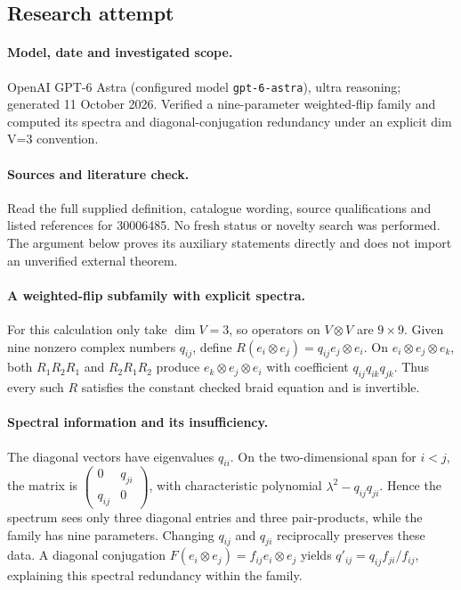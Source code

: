 \documentclass[11pt]{article}
\begin{document}
\subsection{Research attempt}
\paragraph{Model, date and investigated scope.}
OpenAI GPT-6 Astra (configured model \texttt{gpt-6-astra}), ultra reasoning; generated 11 October 2026. Verified a nine-parameter weighted-flip family and computed its spectra and diagonal-conjugation redundancy under an explicit dim V=3 convention.

\paragraph{Sources and literature check.}
Read the full supplied definition, catalogue wording, source qualifications and listed references for 30006485. No fresh status or novelty search was performed. The argument below proves its auxiliary statements directly and does not import an unverified external theorem.

\paragraph{A weighted-flip subfamily with explicit spectra.} For this calculation only take \(\dim V=3\), so operators on \(V\otimes V\) are \(9\times9\). Given nine nonzero complex numbers \(q_{ij}\), define \(R(e_i\otimes e_j)=q_{ij}e_j\otimes e_i\). On \(e_i\otimes e_j\otimes e_k\), both \(R_1R_2R_1\) and \(R_2R_1R_2\) produce \(e_k\otimes e_j\otimes e_i\) with coefficient \(q_{ij}q_{ik}q_{jk}\). Thus every such \(R\) satisfies the constant checked braid equation and is invertible.
\paragraph{Spectral information and its insufficiency.} The diagonal vectors have eigenvalues \(q_{ii}\). On the two-dimensional span for \(i<j\), the matrix is \(\left(\begin{smallmatrix}0&q_{ji}\\q_{ij}&0\end{smallmatrix}\right)\), with characteristic polynomial \(\lambda^2-q_{ij}q_{ji}\). Hence the spectrum sees only three diagonal entries and three pair-products, while the family has nine parameters. Changing \(q_{ij}\) and \(q_{ji}\) reciprocally preserves these data. A diagonal conjugation \(F(e_i\otimes e_j)=f_{ij}e_i\otimes e_j\) yields \(q'_{ij}=q_{ij}f_{ji}/f_{ij}\), explaining this spectral redundancy within the family.
\end{document}
